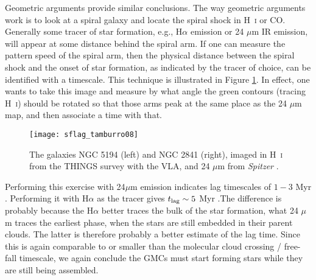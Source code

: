 Geometric arguments provide similar conclusions. The way geometric arguments work is to look at a spiral galaxy and locate the spiral shock in H~\textsc{i} or CO. Generally some tracer of star formation, e.g., H$\alpha$ emission or 24 $\mu$m IR emission, will appear at some distance behind the spiral arm. If one can measure the pattern speed of the spiral arm, then the physical distance between the spiral shock and the onset of star formation, as indicated by the tracer of choice, can be identified with a timescale. This technique is illustrated in Figure \ref{fig:sflag_tamburro08}. In effect, one wants to take this image and measure by what angle the green contours (tracing H~\textsc{i}) should be rotated so that those arms peak at the same place as the 24 $\mu$m map, and then associate a time with that.

\begin{figure}
\texttt{[image: sflag\_tamburro08]}
\caption[H~\textsc{i} and 24 $\mu$m maps of NGC 5194 and 2841]{
\label{fig:sflag_tamburro08}
The galaxies NGC 5194 (left) and NGC 2841 (right), imaged in H~\textsc{i} from the THINGS survey with the VLA, and 24 $\mu$m from \textit{Spitzer} \citep{tamburro08a}.
}
\end{figure}

Performing this exercise with 24$\mu$m emission indicates lag timescales of $1-3$ Myr \citet{tamburro08a}. Performing it with H$\alpha$ as the tracer gives $t_{\rm lag}\sim 5$ Myr \citet{egusa04a}.The difference is probably because the H$\alpha$ better traces the bulk of the star formation, what 24 $\mu$m traces the earliest phase, when the stars are still embedded in their parent clouds. The latter is therefore probably a better estimate of the lag time. Since this is again comparable to or smaller than the molecular cloud crossing / free-fall timescale, we again conclude the GMCs must start forming stars while they are still being assembled.

